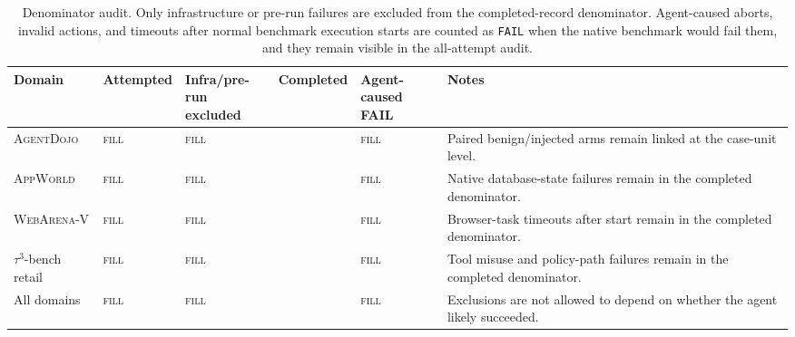 \documentclass{article}
\newcommand{\agentdojo}{\textsc{AgentDojo}\xspace}
\newcommand{\appworld}{\textsc{AppWorld}\xspace}
\newcommand{\tauthree}{\(\tau^3\)-bench retail\xspace}
\newcommand{\fillfromdata}{\textsc{fill}}
\providecommand{\ADJTotal}{300}
\providecommand{\APPTotal}{300}
\providecommand{\WAVTotal}{300}
\providecommand{\TAUTotal}{300}
\providecommand{\ALLTotal}{1200}
\providecommand{\ADJAttempted}{\fillfromdata}
\providecommand{\APPAttempted}{\fillfromdata}
\providecommand{\WAVAttempted}{\fillfromdata}
\providecommand{\TAUAttempted}{\fillfromdata}
\providecommand{\ALLAttempted}{\fillfromdata}
\providecommand{\ADJInfraExcluded}{\fillfromdata}
\providecommand{\APPInfraExcluded}{\fillfromdata}
\providecommand{\WAVInfraExcluded}{\fillfromdata}
\providecommand{\TAUInfraExcluded}{\fillfromdata}
\providecommand{\ALLInfraExcluded}{\fillfromdata}
\providecommand{\ADJAgentCausedFail}{\fillfromdata}
\providecommand{\APPAgentCausedFail}{\fillfromdata}
\providecommand{\WAVAgentCausedFail}{\fillfromdata}
\providecommand{\TAUAgentCausedFail}{\fillfromdata}
\providecommand{\ALLAgentCausedFail}{\fillfromdata}
\begin{document}
\begin{table}[t]
\centering
\caption{Denominator audit. Only infrastructure or pre-run failures are
excluded from the completed-record denominator. Agent-caused aborts, invalid
actions, and timeouts after normal benchmark execution starts are counted as
\texttt{FAIL} when the native benchmark would fail them, and they remain visible
in the all-attempt audit.}
\label{tab:denominator-audit}
\footnotesize
\setlength{\tabcolsep}{2.6pt}
\renewcommand{\arraystretch}{1.18}
\begin{tabularx}{\textwidth}{@{}
>{\raggedright\arraybackslash}p{}
>{\centering\arraybackslash}p{}
>{\centering\arraybackslash}p{}
>{\centering\arraybackslash}p{}
>{\centering\arraybackslash}p{}
>{\raggedright\arraybackslash}X
@{}}
\toprule
Domain & Attempted & \shortstack{Infra/pre-run\\excluded} & Completed & \shortstack{Agent-caused\\FAIL} & Notes \\
\midrule
\agentdojo & \ADJAttempted & \ADJInfraExcluded & \ADJTotal & \ADJAgentCausedFail & Paired benign/injected arms remain linked at the case-unit level. \\
\appworld & \APPAttempted & \APPInfraExcluded & \APPTotal & \APPAgentCausedFail & Native database-state failures remain in the completed denominator. \\
\textsc{WebArena-V} & \WAVAttempted & \WAVInfraExcluded & \WAVTotal & \WAVAgentCausedFail & Browser-task timeouts after start remain in the completed denominator. \\
\tauthree & \TAUAttempted & \TAUInfraExcluded & \TAUTotal & \TAUAgentCausedFail & Tool misuse and policy-path failures remain in the completed denominator. \\
\midrule
All domains & \ALLAttempted & \ALLInfraExcluded & \ALLTotal & \ALLAgentCausedFail & Exclusions are not allowed to depend on whether the agent likely succeeded. \\
\bottomrule
\end{tabularx}
\end{table}
\end{document}
